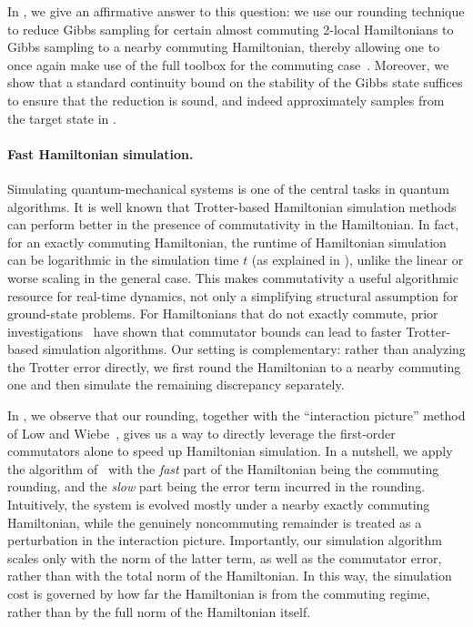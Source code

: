\documentclass[11pt]{article}
\theoremstyle{plain}
\begin{document}
In , we give an affirmative answer to this question: we 
use our rounding technique to reduce Gibbs sampling for certain almost 
commuting $2$-local Hamiltonians to Gibbs sampling to a nearby 
commuting Hamiltonian, thereby allowing one to once again make use of 
the full toolbox for the commuting case~\cite{hwang2025gibbsstatepreparationcommuting,schmidhuber2025hamiltoniandecodedquantuminterferometry}.
Moreover, we show that a standard continuity bound on the stability of the Gibbs state suffices to ensure 
that the reduction is sound, and indeed approximately samples from the 
target state in .

\paragraph{Fast Hamiltonian simulation.}
Simulating quantum-mechanical systems is one of the central tasks in quantum algorithms.
It is well known that Trotter-based Hamiltonian simulation methods can perform better in the presence of commutativity in the Hamiltonian. In fact, for an exactly commuting Hamiltonian, the runtime of Hamiltonian simulation can be logarithmic in the simulation time $t$ (as explained in ), unlike the linear or worse scaling in the general case.
This makes commutativity a useful algorithmic resource for real-time dynamics, not only a simplifying structural assumption for ground-state problems.
For Hamiltonians that do not exactly commute, prior investigations~\cite{childs2021theory} have shown that commutator bounds can lead to faster Trotter-based simulation algorithms.  Our setting is complementary: rather than analyzing the Trotter error directly, we first round the Hamiltonian to a nearby commuting one and then simulate the remaining discrepancy separately.

In , we observe that our rounding, together with the ``interaction picture'' method of Low and Wiebe~\cite{low2018hamiltonian}, gives us a way to directly leverage the first-order commutators alone to speed up Hamiltonian simulation. In a nutshell, we apply the algorithm of~\cite{low2018hamiltonian} with the \emph{fast} part of the Hamiltonian being the commuting rounding, and the \emph{slow} part being the error term incurred in the rounding. 
Intuitively, the system is evolved mostly under a nearby exactly commuting Hamiltonian, while the genuinely noncommuting remainder is treated as a perturbation in the interaction picture.
Importantly, our simulation algorithm scales only with the norm of the latter term, as well as the commutator error,
rather than with the total norm of the Hamiltonian.
In this way, the simulation cost is governed by how far the Hamiltonian is from the commuting regime, rather than by the full norm of the Hamiltonian itself.
\end{document}

